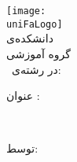 \thispagestyle{empty}
\begin{center}
\texttt{[image: \\uniFaLogo]}
\\{\Large 
دانشکده‌ی \qig\QfacultyName\qiga
\\
گروه آموزشی
\qig\QdepartmentName\qiga}\\[1em]
\vspace*{\fill}
{\LARGE \whatDegreeTypeFull\
در رشته‌ی:
\\
\QstudentStudyField{\MySep}
\qig\QstudentStudyOrientation\qiga
}
\end{center}
\vspace*{\fill}
\begin{center}
\begin{large}
\begin{center}
عنوان \whatDegreeType:
\end{center}
\end{large}
\end{center}
\begin{center}
\begin{huge}
\textbf{%
\qig\QthesisTitle\qiga
}
\end{huge}
\end{center}\vspace*{\fill}
\begin{center}
\begin{Large}
\QprofTitle
\\
\textbf{%
\qig\QprofName\qiga
}
\end{Large}
\end{center}
\Advisors
\begin{center}
\begin{Large}
توسط:
\\%
\textbf{%
\qig\QstudentName\qiga
}
\end{Large}
\end{center}
\vspace*{\fill}
\begin{center}
\qig\QdefData\qiga
\end{center}
\restoregeometry 